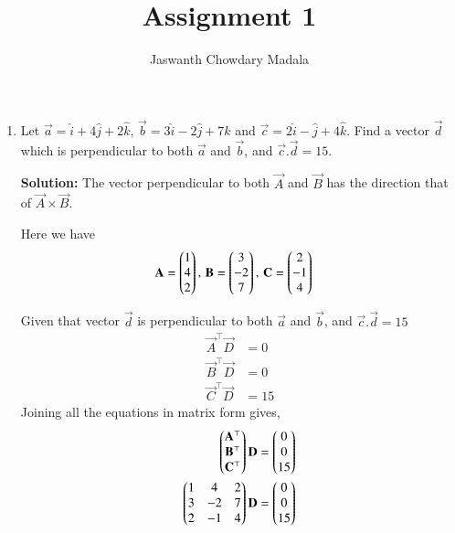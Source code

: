 \documentclass[journal,12pt,twocolumn]{IEEEtran}
\begin{document}
\vspace{3cm}


\title{Assignment 1}
\author{Jaswanth Chowdary Madala}





\maketitle

\newpage


\bigskip

\renewcommand{\thefigure}{\theenumi}
\renewcommand{\thetable}{\theenumi}

\begin{enumerate}
\item Let 	$\overrightarrow{a} = \hat{i}+4\hat{j}+2\hat{k}$, $\overrightarrow{b} = 3\hat{i}-2\hat{j}+7\hat{k}$ and 	$\overrightarrow{c} = 2\hat{i}-\hat{j}+4\hat{k}$. Find a vector $\overrightarrow{d}$ which is perpendicular to both $\overrightarrow{a}$ and $\overrightarrow{b}$, and $\overrightarrow{c}.\overrightarrow{d}=15$.

\textbf{Solution:} The vector perpendicular to both $\vec{A}$ and $\vec{B}$ has the direction that of $\vec{A} \times \vec{B}$.

Here we have
\begin{align} 
\mathbf{A}=\begin{pmatrix}1\\4\\2\end{pmatrix}, \, \mathbf{B}&=\begin{pmatrix}3\\-2\\7\end{pmatrix}, \,\mathbf{C}=\begin{pmatrix}2\\-1\\4\end{pmatrix}
\end{align}

Given that vector $\overrightarrow{d}$ is perpendicular to both $\overrightarrow{a}$ and $\overrightarrow{b}$, and $\overrightarrow{c}.\overrightarrow{d}=15$
\begin{align}
\vec{A}^{\top}\vec{D} &= 0\\
\vec{B}^{\top}\vec{D} &= 0\\
\vec{C}^{\top}\vec{D} &= 15
\end{align}
Joining all the equations in matrix form gives,
\begin{align}
\begin{pmatrix}\mathbf{A}^{\top} \\\mathbf{B}^{\top}\\\mathbf{C}^{\top}\end{pmatrix}\mathbf{D} &= \begin{pmatrix}0\\0\\15\end{pmatrix}\\
\begin{pmatrix}1&4&2 \\3&-2&7 \\2&-1&4\end{pmatrix}\mathbf{D} &= \begin{pmatrix}0\\0\\15\end{pmatrix}
\label{eq:1}
\end{align}


\end{enumerate}
\end{document}
